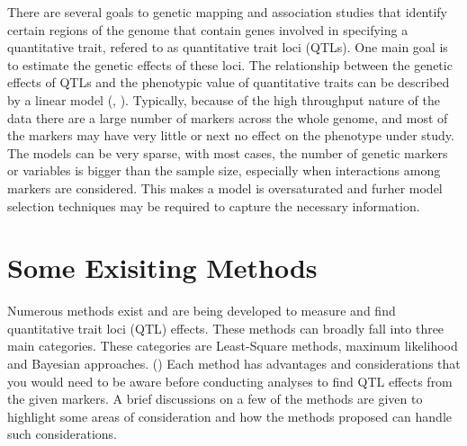 \documentclass[11pt,]{book}
\theoremstyle{definition}
\theoremstyle{definition}
\theoremstyle{remark}
\begin{document}
There are several goals to genetic mapping and association studies that
identify certain regions of the genome that contain genes involved in
specifying a quantitative trait, refered to as quantitative trait loci
(QTLs). One main goal is to estimate the genetic effects of these loci.
The relationship between the genetic effects of QTLs and the phenotypic
value of quantitative traits can be described by a linear model
(\cite{collard2005introduction}, \cite{xu2007empirical}). Typically,
because of the high throughput nature of the data there are a large
number of markers across the whole genome, and most of the markers may
have very little or next no effect on the phenotype under study. The
models can be very sparse, with most cases, the number of genetic
markers or variables is bigger than the sample size, especially when
interactions among markers are considered. This makes a model is
oversaturated and furher model selection techniques may be required to
capture the necessary information. \cite{dong2015accurate}

\section{Some Exisiting Methods}\label{some-exisiting-methods}

Numerous methods exist and are being developed to measure and find
quantitative trait loci (QTL) effects. These methods can broadly fall
into three main categories. These categories are Least-Square methods,
maximum likelihood and Bayesian approaches. (\cite{wu2007statistical})
Each method has advantages and considerations that you would need to be
aware before conducting analyses to find QTL effects from the given
markers. A brief discussions on a few of the methods are given to
highlight some areas of consideration and how the methods proposed can
handle such considerations.
\end{document}
